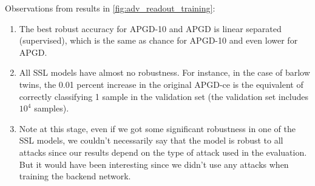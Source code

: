 \documentclass[../thesis.tex]{subfiles}
\begin{document}
	Observations from results in \ref{fig:adv_readout_training}:
	
	\begin{enumerate}
		
		\item The best robust accuracy for APGD-10 and APGD is linear separated (supervised), which is the same as chance for APGD-10 and even lower for APGD.
		
		
		
		\item All SSL models have almost no robustness. For instance, in the case of barlow twins, the 0.01 percent increase in the original APGD-ce is the equivalent of correctly classifying 1 sample in the validation set (the validation set includes $10^4$ samples). 
		
		
		
		
		\item Note at this stage, even if we got some significant robustness in one of the SSL models, we couldn't necessarily say that the model is robust to all attacks since our results depend on the type of attack used in the evaluation. But it would have been interesting since we didn't use any attacks when training the backend network. 
		
	\end{enumerate}
	
\end{document}
